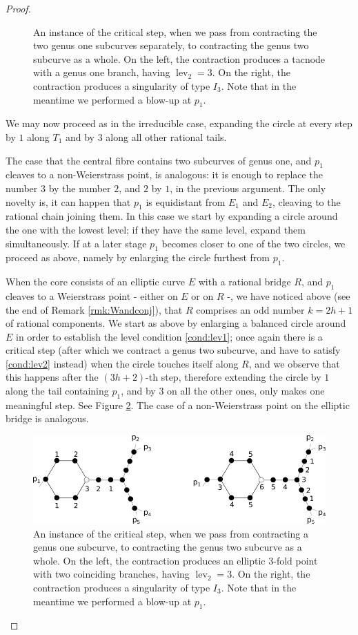 \documentclass[11pt]{amsart}
\newcommand{\lev}{\operatorname{lev}}
\theoremstyle{plain}
\theoremstyle{definition}
\begin{document}
\begin{proof}
\begin{itemize}[leftmargin=.4cm]
\begin{figure}
   \caption{An instance of the critical step, when we pass from contracting the two genus one subcurves separately, to contracting the genus two subcurve as a whole. On the left, the contraction produces a tacnode with a genus one branch, having $\lev_2=3$. On the right, the contraction produces a singularity of type $I_3$. Note that in the meantime we performed a blow-up at $p_1$.}\label{fig:critical}
  \end{figure}
 We may now proceed as in the irreducible case, expanding the circle at every step by $1$ along $T_1$ and by $3$ along all other rational tails.
 \end{itemize}
 The case that the central fibre contains two subcurves of genus one, and $p_1$ cleaves to a non-Weierstrass point, is analogous: it is enough to replace the number $3$ by the number $2$, and $2$ by $1$, in the previous argument. The only novelty is, it can happen that $p_1$ is equidistant from $E_1$ and $E_2$, cleaving to the rational chain joining them. In this case we start by expanding a circle around the one with the lowest level; if they have the same level, expand them simultaneously. If at a later stage $p_1$ becomes closer to one of the two circles, we proceed as above, namely by enlarging the circle furthest from $p_1$.
 
 \smallskip
 
 When the core consists of an elliptic curve $E$ with a rational bridge $R$, and $p_1$ cleaves to a Weierstrass point - either on $E$ or on $R$ -, we have noticed above (see the end of Remark \ref{rmk:Wandconj}), that $R$ comprises an odd number $k=2h+1$ of rational components. We start as above by enlarging a balanced circle around $E$ in order to establish the level condition \eqref{cond:lev1}; once again there is a critical step (after which we contract a genus two subcurve, and have to satisfy \eqref{cond:lev2} instead) when the circle touches itself along $R$, and we observe that this happens after the $(3h+2)$-th step, therefore extending the circle by $1$ along the tail containing $p_1$, and by $3$ on all the other ones, only makes one meaningful step. See Figure \ref{fig:crit_step_ER}. The case of a non-Weierstrass point on the elliptic bridge is analogous.
 \begin{figure}
   \includegraphics[width=.8\textwidth]{critical_step_ER}
   \caption{An instance of the critical step, when we pass from contracting a genus one subcurve, to contracting the genus two subcurve as a whole. On the left, the contraction produces an elliptic $3$-fold point with two coinciding branches, having $\lev_2=3$. On the right, the contraction produces a singularity of type $I_3$. Note that in the meantime we performed a blow-up at $p_1$.}\label{fig:crit_step_ER}
  \end{figure}
  

\end{proof}
\end{document}
